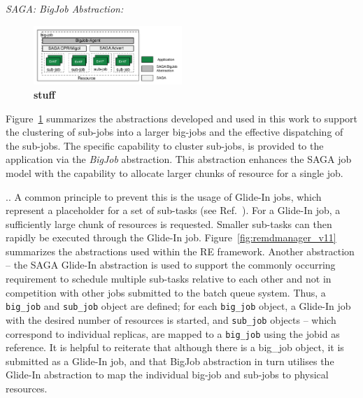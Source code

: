 \documentclass[conference,final]{IEEEtran}
\begin{document}
{\it SAGA: BigJob Abstraction:}
\begin{figure}[t]
      \centering
      \includegraphics[width=0.50\textwidth]{./figures/enkf_bigjob.pdf}
      \caption{\footnotesize \bf stuff }
      \label{fig:abstractions}
\end{figure}
Figure~\ref{fig:abstractions} summarizes the abstractions developed
and used in this work to support the clustering of sub-jobs into a
larger big-jobs and the effective dispatching of the sub-jobs.  The
specific capability to cluster sub-jobs, is provided to the
application via the \emph{BigJob} abstraction. This abstraction
enhances the SAGA job model with the capability to allocate larger
chunks of resource for a single job.

.. A common principle to prevent this is the usage of Glide-In jobs,
which represent a placeholder for a set of sub-tasks (see
Ref.~\cite{citeulike:291860}).  For a Glide-In job, a sufficiently
large chunk of resources is requested. Smaller sub-tasks can then
rapidly be executed through the Glide-In job.
Figure~\ref{fig:remdmanager_v11} summarizes the abstractions used
within the RE framework.  Another abstraction -- the SAGA Glide-In
abstraction is used to support the commonly occurring requirement to
schedule multiple sub-tasks relative to each other and not in
competition with other jobs submitted to the batch queue system.
Thus, a \texttt{big\_job} and \texttt{sub\_job} object are defined;
for each \texttt{big\_job} object, a Glide-In job with the desired
number of resources is started, and \texttt{sub\_job} objects -- which
correspond to individual replicas, are mapped to a \texttt{big\_job}
using the jobid as reference. It is helpful to reiterate that although
there is a big\_job object, it is submitted as a Glide-In job, and
that BigJob abstraction in turn utilises the Glide-In abstraction to
map the individual big-job and sub-jobs to physical resources.
\end{document}
